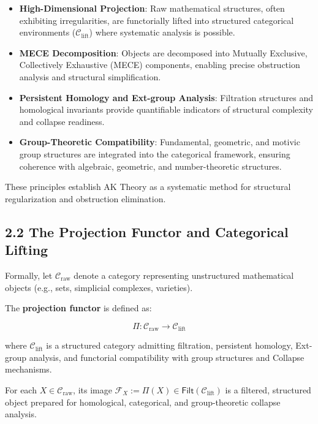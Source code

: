 \documentclass[11pt]{article}
\begin{document}
\begin{itemize}
    \item \textbf{High-Dimensional Projection}: Raw mathematical structures, often exhibiting irregularities, are functorially lifted into structured categorical environments ($\mathcal{C}_{\mathrm{lift}}$) where systematic analysis is possible.
    \item \textbf{MECE Decomposition}: Objects are decomposed into Mutually Exclusive, Collectively Exhaustive (MECE) components, enabling precise obstruction analysis and structural simplification.
    \item \textbf{Persistent Homology and Ext-group Analysis}: Filtration structures and homological invariants provide quantifiable indicators of structural complexity and collapse readiness.
    \item \textbf{Group-Theoretic Compatibility}: Fundamental, geometric, and motivic group structures are integrated into the categorical framework, ensuring coherence with algebraic, geometric, and number-theoretic structures.
\end{itemize}

These principles establish AK Theory as a systematic method for structural regularization and obstruction elimination.

\subsection{2.2 The Projection Functor and Categorical Lifting}

Formally, let $\mathcal{C}_{\mathrm{raw}}$ denote a category representing unstructured mathematical objects (e.g., sets, simplicial complexes, varieties).

The \textbf{projection functor} is defined as:

\begin{equation}
\Pi : \mathcal{C}_{\mathrm{raw}} \longrightarrow \mathcal{C}_{\mathrm{lift}}
\end{equation}

where $\mathcal{C}_{\mathrm{lift}}$ is a structured category admitting filtration, persistent homology, Ext-group analysis, and functorial compatibility with group structures and Collapse mechanisms.

For each $X \in \mathcal{C}_{\mathrm{raw}}$, its image $\mathcal{F}_X := \Pi(X) \in \mathsf{Filt}(\mathcal{C}_{\mathrm{lift}})$ is a filtered, structured object prepared for homological, categorical, and group-theoretic collapse analysis.
\end{document}
